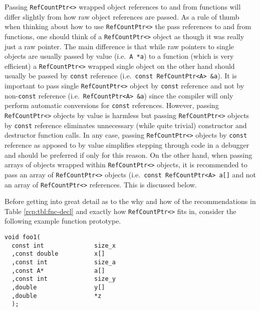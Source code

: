 Passing {}\texttt{Ref\-Count\-Ptr<>} wrapped object references to and
from functions will differ slightly from how raw object references are
passed.  As a rule of thumb when thinking about how to use
{}\texttt{Ref\-Count\-Ptr<>} the pass references to and from
functions, one should think of a {}\texttt{Ref\-Count\-Ptr<>} object
as though it was really just a raw pointer.  The main difference is
that while raw pointers to single objects are usually passed by value
(i.e.~{}\texttt{A *a}) to a function (which is very efficient) a
{}\texttt{Ref\-Count\-Ptr<>} wrapped single object on the other hand
should usually be passed by {}\texttt{const} reference
(i.e.~{}\texttt{const Ref\-Count\-Ptr<A> \&a}).  It is important to
pass single {}\texttt{Ref\-Count\-Ptr<>} object by {}\texttt{const}
reference and not by non-{}\texttt{const} reference
(i.e.~{}\texttt{Ref\-Count\-Ptr<A> \&a}) since the compiler will only
perform automatic conversions for {}\texttt{const} references.
However, passing {}\texttt{Ref\-Count\-Ptr<>} objects by value is
harmless but passing {}\texttt{Ref\-Count\-Ptr<>} objects by
{}\texttt{const} reference eliminates unnecessary (while quite trivial)
constructor and destructor function calls.  In any case, passing
{}\texttt{Ref\-Count\-Ptr<>} objects by {}\texttt{const} reference as
apposed to by value simplifies stepping through code in a debugger and
should be preferred if only for this reason.  On the other hand, when
passing arrays of objects wrapped within {}\texttt{Ref\-Count\-Ptr<>}
objects, it is recommended to pass an array of
{}\texttt{Ref\-Count\-Ptr<>} objects (i.e.~{}\texttt{const
Ref\-Count\-Ptr<A> a[]} and not an array of
{}\texttt{Ref\-Count\-Ptr<>} references.  This is discussed below.

Before getting into great detail as to the why and how of the
recommendations in Table {}\ref{rcp:tbl:fnc-decl} and exactly how
{}\texttt{Ref\-Count\-Ptr<>} fits in, consider the following example
function prototype.

{\scriptsize\begin{verbatim}
void foo1(
  const int              size_x
  ,const double          x[]
  ,const int             size_a
  ,const A*              a[]
  ,const int             size_y
  ,double                y[]
  ,double                *z
  );
\end{verbatim}}

